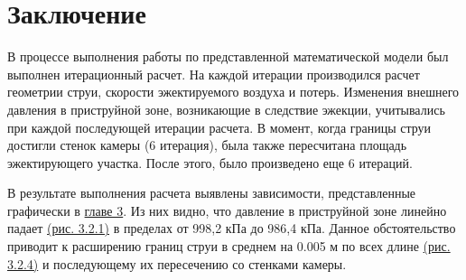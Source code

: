 \chapter{Заключение}

В процессе выполнения работы по представленной математической модели был выполнен итерационный расчет. На каждой итерации производился расчет геометрии струи, скорости эжектируемого воздуха и потерь. Изменения внешнего давления в приструйной зоне, возникающие в следствие эжекции, учитывались при каждой последующей итерации расчета. В момент, когда границы струи достигли стенок камеры (6 итерация), была также пересчитана площадь эжектирующего участка. После этого, было произведено еще 6 итераций.

В результате выполнения расчета выявлены зависимости, представленные графически в \hyperref[Chapter3]{главе 3}. Из них видно, что давление в приструйной зоне линейно падает \hyperref[fig:ExternalPressure]{(рис. 3.2.1)} в пределах от 998,2 кПа до 986,4 кПа. Данное обстоятельство приводит к расширению границ струи в среднем на 0.005 м по всех длине \hyperref[fig:FluidStructure]{(рис. 3.2.4)} и последующему их пересечению со стенками камеры.